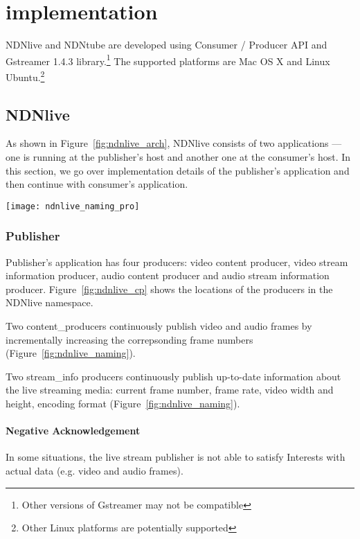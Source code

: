 \section{implementation} %
\label{sec:implementation}
NDNlive and NDNtube are developed using Consumer / Producer API and Gstreamer 1.4.3 library.\footnote{Other versions of Gstreamer may not be compatible}
The supported platforms are Mac OS X and Linux Ubuntu.\footnote{Other Linux platforms are potentially supported} 

\subsection{NDNlive}
As shown in Figure~\ref{fig:ndnlive_arch}, NDNlive consists of two applications --- one is running at the publisher's host and another one at the consumer's host. In this section, we go over implementation details of the publisher's application and then continue with consumer's application.

\begin{figure*}%
  \centering
  \texttt{[image: ndnlive\_naming\_pro]}
  \caption{Locations of producers and consumers in the NDNlive namespace.}
  \label{fig:ndnlive_cp}
\end{figure*}

\subsubsection{Publisher}
\label{ssub:ndnlive_pro}
Publisher's application has four producers: video content producer, video stream information producer, audio content producer and audio stream information producer. Figure~\ref{fig:ndnlive_cp} shows the locations of the producers in the NDNlive namespace. 

Two content\_producers continuously publish video and audio frames by incrementally increasing the correpsonding frame numbers (Figure~\ref{fig:ndnlive_naming}). 

Two stream\_info producers continuously publish up-to-date information about the live streaming media: current frame number, frame rate, video width and height, encoding format (Figure~\ref{fig:ndnlive_naming}).

\paragraph{Negative Acknowledgement} %
\label{par:negative_acknowledgement}
\vspace{0.3cm}
In some situations, the live stream publisher is not able to satisfy Interests with actual data (e.g. video and audio frames).

